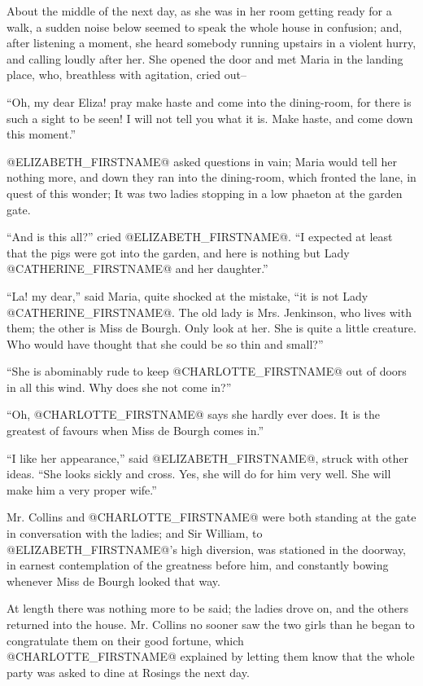 About the middle of the next day, as she was in her room getting ready
for a walk, a sudden noise below seemed to speak the whole house in
confusion; and, after listening a moment, she heard somebody running
upstairs in a violent hurry, and calling loudly after her. She opened
the door and met Maria in the landing place, who, breathless with
agitation, cried out--

``Oh, my dear Eliza! pray make haste and come into the dining-room, for
there is such a sight to be seen! I will not tell you what it is. Make
haste, and come down this moment.''

@ELIZABETH_FIRSTNAME@ asked questions in vain; Maria would tell her nothing more,
and down they ran into the dining-room, which fronted the lane, in
quest of this wonder; It was two ladies stopping in a low phaeton at the
garden gate.

``And is this all?'' cried @ELIZABETH_FIRSTNAME@. ``I expected at least that the pigs
were got into the garden, and here is nothing but Lady @CATHERINE_FIRSTNAME@ and her
daughter.''

``La! my dear,'' said Maria, quite shocked at the mistake, ``it is not
Lady @CATHERINE_FIRSTNAME@. The old lady is Mrs. Jenkinson, who lives with them;
the other is Miss de Bourgh. Only look at her. She is quite a little
creature. Who would have thought that she could be so thin and small?''

``She is abominably rude to keep @CHARLOTTE_FIRSTNAME@ out of doors in all this wind.
Why does she not come in?''

``Oh, @CHARLOTTE_FIRSTNAME@ says she hardly ever does. It is the greatest of favours
when Miss de Bourgh comes in.''

``I like her appearance,'' said @ELIZABETH_FIRSTNAME@, struck with other ideas. ``She
looks sickly and cross. Yes, she will do for him very well. She will
make him a very proper wife.''

Mr. Collins and @CHARLOTTE_FIRSTNAME@ were both standing at the gate in conversation
with the ladies; and Sir William, to @ELIZABETH_FIRSTNAME@'s high diversion, was
stationed in the doorway, in earnest contemplation of the greatness
before him, and constantly bowing whenever Miss de Bourgh looked that
way.

At length there was nothing more to be said; the ladies drove on, and
the others returned into the house. Mr. Collins no sooner saw the two
girls than he began to congratulate them on their good fortune, which
@CHARLOTTE_FIRSTNAME@ explained by letting them know that the whole party was asked
to dine at Rosings the next day.



